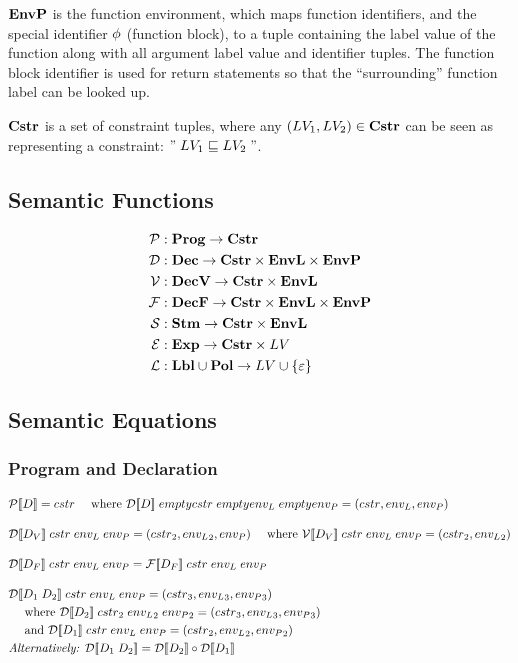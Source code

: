 $\mathbf{EnvP}$ is the function environment, which maps function identifiers, and the special identifier $\phi$ (function block), to a tuple containing the label value of the function along with all argument label value and identifier tuples.
The function block identifier is used for return statements so that the ``surrounding'' function label can be looked up.

$\mathbf{Cstr}$ is a set of constraint tuples, where any $(LV_1, LV_2) \in \mathbf{Cstr}$ can be seen as representing a constraint: $" \; LV_1 \sqsubseteq LV_2 \; "$.

\subsection{Semantic Functions}
\begin{align*}
\mathcal{P} & : \mathbf{Prog} \rightarrow \mathbf{Cstr} \\
\mathcal{D} & : \mathbf{Dec} \rightarrow \mathbf{Cstr} \times \mathbf{EnvL} \times \mathbf{EnvP} \\
\mathcal{V} & : \mathbf{DecV} \rightarrow \mathbf{Cstr} \times \mathbf{EnvL} \\
\mathcal{F} & : \mathbf{DecF} \rightarrow \mathbf{Cstr} \times \mathbf{EnvL} \times \mathbf{EnvP} \\
\mathcal{S} & : \mathbf{Stm} \rightarrow \mathbf{Cstr} \times \mathbf{EnvL} \\
\mathcal{E} & : \mathbf{Exp} \rightarrow \mathbf{Cstr} \times LV \\
\mathcal{L} & : \mathbf{Lbl} \cup \mathbf{Pol} \rightarrow LV \cup \{ \varepsilon \}
\end{align*}

\subsection{Semantic Equations}

\subsubsection{Program and Declaration}
\begin{align*}
& \iP\dblSq{D} = \icstr \dsWhere{\iD\dblSq{D} \; empty\icstr \; empty\ienvL \; empty\ienvP = (\icstr, \ienvL, \ienvP)} \rspace
& \iD\dblSq{D_V} \; \icstr \; \ienvL \; \ienvP = (\icstr_2, \ienvL_2, \ienvP) \dsWhere{\iV\dblSq{D_V} \; \icstr \; \ienvL \; \ienvP = (\icstr_2, \ienvL_2)} \rspace
& \iD\dblSq{D_F} \; \icstr \; \ienvL \; \ienvP = \iF\dblSq{D_F} \; \icstr \; \ienvL \; \ienvP \rspace
& \iD\dblSq{D_1 \; D_2} \; \icstr \; \ienvL \; \ienvP = (\icstr_3, \ienvL_3, \ienvP_3) \\
& \quad \text{ where } \iD\dblSq{D_2} \; \icstr_2 \; \ienvL_2 \; \ienvP_2  = (\icstr_3, \ienvL_3, \ienvP_3) \\
& \quad \text{ and } \iD\dblSq{D_1} \; \icstr \; \ienvL \; \ienvP = (\icstr_2, \ienvL_2, \ienvP_2) \\
& \textit{Alternatively: } \iD\dblSq{D_1 \; D_2} = \iD\dblSq{D_2} \circ \iD\dblSq{D_1}
\end{align*}


